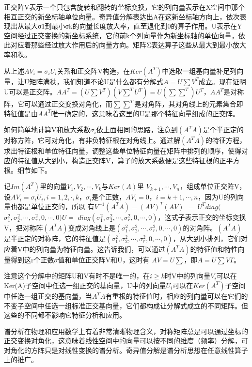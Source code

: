 \songti

正交阵V表示一个只包含旋转和翻转的坐标变换，它的列向量表示在X空间中那个相互正交的新坐标轴单位向量。奇异值分解表达出A在这新坐标轴方向上，依次表现出从最大σ1到最小σk的向量长度放大率，直至退化到0的算子作用。U表示在Y空间经过正交变换的新坐标系统，它的前k个列向量作为新坐标轴的单位向量，依此对应着那些经过放大作用后的向量方向。矩阵Σ表达算子这些从最大到最小放大率和秩。

从上述$ AV_i=\sigma_iU_i $关系和正交阵V构造，在$ Ker(A^T) $中选取一组基向量补足列向量，让U矩阵满秩，我们知道不论U是什么都有分解式$ A = U\sum V^T $成立。现在证明U可以是正交阵。$ AA^T = (U\sum V^T)(V\sum^TU^T)  =  U(\sum\sum^T)U^T $，$ AA^T $是对称阵，它可以通过正交变换对角化，而$ \sum\sum^T $是对角阵，其对角线上的元素集合即特征值是由$ AA^T $唯一确定的，这意味着这里的U是那个特征向量组成的正交阵。

如何简单地计算V和放大系数$ \sigma_i $依上面相同的思路，注意到$ (A^TA) $是个半正定的对称方阵，它可对角化，有非负特征根在对角线上。通过解$ (A^TA) $的特征方程，求出特征根和单位特征向量，调整这些单位特征向量在矩阵中排列的顺序，使得对应的特征值从大到小，构造正交阵V，算子的放大系数便是这些特征根的正平方根。细节如下。

记$ Im(A^T) $里的向量$  {V_1,V_2, \cdots,V_k}  $与$ Ker(A)  $里 $ {V_{k+1}, \cdots, V_{n}} $，组成单位正交阵V，设$ AV_i=\sigma_iU_i , i=1, 2, \cdot,k，\sigma_i$是个正数$ ，AV_i=0，i=k+1, \cdots, n $，因为U的列向量也都是单位正交的，所以 有$  V^{-1}(A^TA)  =  (AV)^T(AV)$  $= $  $ U^Tdiag($  $\sigma_1^2,\sigma_2^2, \cdots, \sigma_r^2,0, \cdots,0)U = $   $ diag(\sigma_1^2,\sigma_2^2, \cdots, \sigma_r^2,0, \cdots,0) $，这式子表示正交的坐标变换V，把对称阵$ (A^TA) $变成对角线上是$ (\sigma_1^2,\sigma_2^2, \cdots, \sigma_r^2,0, \cdots,0) $的对角阵。$ (A^TA) $是半正定的对称阵，它的特征值是$ (\sigma_1^2,\sigma_2^2, \cdots, \sigma_r^2,0, \cdots,0) $，从大到小排列，它们对应着V中的列向量为特征向量。这告诉我们，可以通过$ (A^TA) $的特征值和特性向量得到这r个正数$ \sigma $值和单位正交阵V和U，这时有 $ AV = U\sum $，即$ A = U\sum VT $。

注意这个分解中的矩阵U和V有时不是唯一的，在$ i\ge k $时V中的列向量$ V_i $可以在Ker(A)子空间中任选一组正交的基向量，U中的列向量$ U_i $可以在$ Ker(A^T) $子空间中任选一组正交的基向量，当$ A^TA $有重根的特征值时，相应的列向量可以在它们的不变子空间中任选一组标准正交基向量，它们都构成让分解式成立的不同矩阵。但这些的不同都不影响它特征分析和应用。

谱分析在物理和应用数学上有着非常清晰物理含义，对称矩阵总是可以通过坐标的正交变换对角化，这意味着线性空间中的向量可以按不同的维度（频率）分解，可对角化的方阵只是对线性变换的谱分析。奇异值分解是谱分析思想在任意线性算子上的推广。

